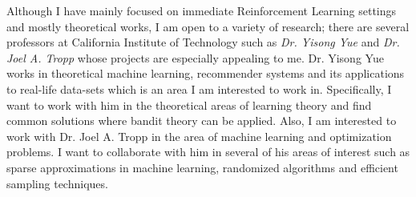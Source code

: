 \documentclass[twoside]{article}
\begin{document}
	Although I have mainly focused on immediate Reinforcement Learning settings and mostly theoretical works, I am open to a variety of research; there are several professors at California Institute of Technology such as \textit{Dr. Yisong Yue} and \textit{Dr. Joel A. Tropp} whose projects are especially appealing to me. Dr. Yisong Yue works in theoretical machine learning, recommender systems and its applications to real-life data-sets which is an area I am interested to work in. Specifically, I want to work with him in the theoretical areas of learning theory and find common solutions where bandit theory can be applied. Also, I am interested to work with Dr. Joel A. Tropp in the area of machine learning and optimization problems. I want to collaborate with him in several of his areas of interest such as sparse approximations in machine learning, randomized algorithms and efficient sampling techniques.



\end{document}
